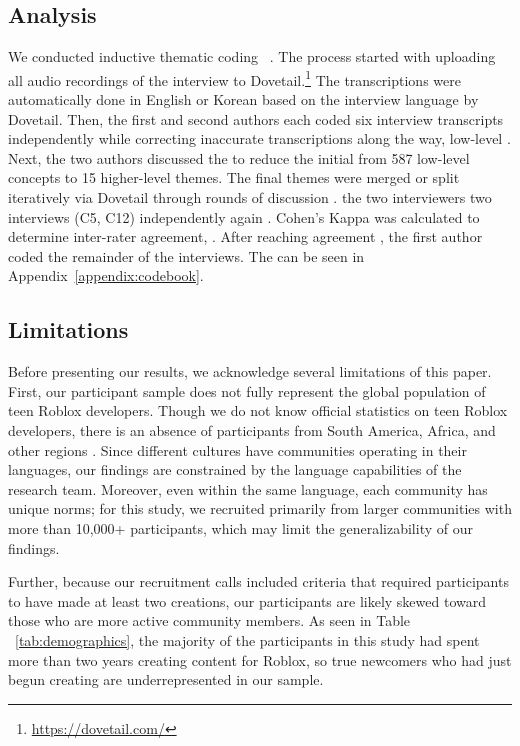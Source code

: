 \subsection{Analysis}
We conducted inductive thematic coding~\cite{braun2006using} .
The process started with uploading all audio recordings of the interview to Dovetail.\footnote{\url{https://dovetail.com/}} The transcriptions were automatically done in English or Korean based on the interview language by Dovetail. Then, the first and second authors each coded six interview transcripts independently while correcting inaccurate transcriptions along the way,  low-level  . Next, the two authors discussed the  to reduce the initial  from 587 low-level concepts to 15 higher-level themes. The final themes were merged or split iteratively via Dovetail through rounds of discussion . 
 the two interviewers  two interviews (C5, C12) independently again . {Cohen's Kappa was calculated to determine} inter-rater agreement, . After reaching agreement , the first author coded the remainder of the interviews. The  can be seen in Appendix~\ref{appendix:codebook}.

\subsection{Limitations}
Before presenting our results, we acknowledge several limitations of this paper. First, our participant sample does not fully represent the global population of teen Roblox developers. Though we do not know official statistics on teen Roblox developers, there is an absence of participants from South America, Africa, and other regions . Since different cultures have communities operating in their languages, our findings are constrained by the language capabilities of the research team. Moreover, even within the same language, each community has unique norms; for this study, we recruited primarily from larger communities with more than 10,000+ participants, which may limit the generalizability of our findings. 

Further, because our recruitment calls included criteria that required participants to have made at least two creations, our participants are likely skewed toward those who are more active community members. As seen in Table ~\ref{tab:demographics}, the majority of the participants in this study had spent more than two years creating content for Roblox, so true newcomers who had just begun creating are underrepresented in our sample. 
